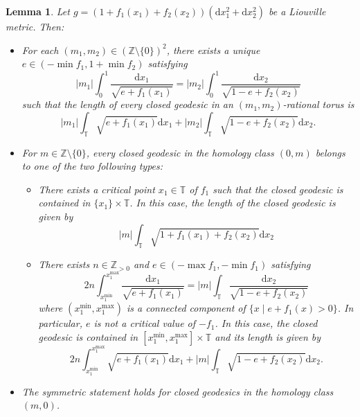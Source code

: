 \documentclass[11pt,letterpaper,oneside]{amsart}
\newcommand{\Z}{\mathbb{Z}}
\newcommand{\T}{\mathbb{T}}
\newtheorem{lemm}[theo]{Lemma}
\theoremstyle{definition}
\theoremstyle{remark}
\theoremstyle{definition}
\theoremstyle{remark}
\newcommand{\dif}{\mathrm{d}}
\begin{document}
\begin{lemm}\label{lem:length-liouville}
    Let $g = (1 + f_1(x_1) + f_2(x_2)) (\dif x_1^2 + \dif x_2^2)$ be a Liouville metric. Then:
    \begin{itemize}
        \item For each $(m_1, m_2) \in (\Z\setminus\{0\})^2$, there exists a unique 
        $e \in (-\min f_1, 1 + \min f_2)$  satisfying 
        \begin{equation} \label{eq:m1m2 rot}
            |m_1|\int_0^1 \frac{\dif x_1}{\sqrt{e + f_1(x_1)}} = 
            |m_2|\int_0^1 \frac{\dif x_2}{\sqrt{1 - e + f_2(x_2)}}
        \end{equation}
        such that the length of every closed geodesic in an $(m_1, m_2)$-rational torus is 
        \begin{equation} \label{eq:rot length}
            |m_1| \int_\T \sqrt{e + f_1(x_1)} \dif x_1 + |m_2| \int_\T \sqrt{1 - e + f_2(x_2)} \dif x_2.
        \end{equation}
        \item For $m \in \Z\setminus\{0\}$, every closed geodesic in the homology class $(0,m)$ belongs to one of the two following types:
        \begin{itemize}
            \item There exists a critical point $x_1 \in \T$ of $f_1$ such that the closed geodesic is contained in $\{x_1\} \times \T$. 
            In this case, the length of the closed geodesic is given by 
            \begin{equation}  \label{eq:stat length}
                |m|\int_\T \sqrt{1 + f_1(x_1) + f_2(x_2)} \dif x_2
            \end{equation}
            \item There exists $n \in \Z_{>0}$ and $e \in (- \max f_1, -\min f_1)$ satisfying
            \begin{equation} \label{eq:m1m2 osc}
                2n\int_{x_1^{\min}}^{x_1^{\max}} \frac{\dif x_1}{\sqrt{e + f_1(x_1)}} = 
                |m|\int_\T \frac{\dif x_2}{\sqrt{1 - e + f_2(x_2)}}
            \end{equation}
            where $(x_1^{\min}, x_1^{\max})$ is a connected component of $\{x \mid e + f_1(x) > 0\}$.
            In particular, $e$ is not a critical value of $-f_1$.
            In this case, the closed geodesic is contained in $[x_1^{\min}, x_1^{\max}] \times \T$ and its length is given by 
            \begin{equation} \label{eq:osc length}
                2n\int_{x_1^{\min}}^{x_1^{\max}} \sqrt{e + f_1(x_1)} \dif x_1 + |m| \int_\T \sqrt{1 - e + f_2(x_2)} \dif x_2.
            \end{equation}
        \end{itemize}
        \item The symmetric statement holds for closed geodesics in the homology class $(m,0)$.
    \end{itemize}
\end{lemm}
\end{document}
